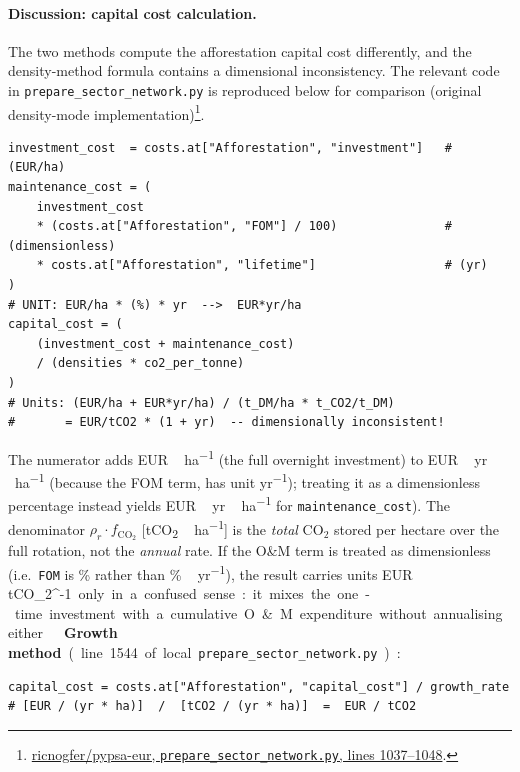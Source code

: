 \documentclass[12pt, a4paper]{article}
\begin{document}
\paragraph{Discussion: capital cost calculation.}
The two methods compute the afforestation capital cost differently,
and the density-method formula contains a dimensional inconsistency.
The relevant code in
\texttt{prepare\_sector\_network.py} is reproduced
below for comparison (original density-mode implementation)\footnote{%
  \href{https://github.com/ricnogfer/pypsa-eur/blob/c1e990cd634cf236e0fbcedcb46570057177ed6f/scripts/prepare_sector_network.py\#L1037--L1048}{%
    ricnogfer/pypsa-eur, \texttt{prepare\_sector\_network.py}, lines 1037--1048}.}.

\medskip

\begin{verbatim}
investment_cost  = costs.at["Afforestation", "investment"]   # (EUR/ha)
maintenance_cost = (
    investment_cost
    * (costs.at["Afforestation", "FOM"] / 100)               # (dimensionless)
    * costs.at["Afforestation", "lifetime"]                  # (yr)
)
# UNIT: EUR/ha * (%) * yr  -->  EUR*yr/ha
capital_cost = (
    (investment_cost + maintenance_cost)
    / (densities * co2_per_tonne)
)
# Units: (EUR/ha + EUR*yr/ha) / (t_DM/ha * t_CO2/t_DM)
#       = EUR/tCO2 * (1 + yr)  -- dimensionally inconsistent!
\end{verbatim}

\noindent The numerator adds \si{EUR\,ha^{-1}} (the full overnight investment) to
\si{EUR\,yr\,ha^{-1}} (because the FOM term, has unit
\si{yr^{-1}}); treating it as a dimensionless percentage instead yields
\si{EUR\,yr\,ha^{-1}} for \texttt{maintenance\_cost}). The denominator
$\rho_r \cdot f_{\mathrm{CO}_2}$ [\si{tCO_2\,ha^{-1}}] is the \emph{total}
CO$_2$ stored per hectare over the full rotation, not the \emph{annual} rate.
If the O\&M term is treated as dimensionless (i.e.\ \texttt{FOM} is
\si{\%} rather than \si{\%\,yr^{-1}}), the result carries units
\si{EUR\,tCO_2^{-1}} only in a confused sense: it mixes the one-time investment
with a cumulative O\&M expenditure without annualising either.

\medskip
\noindent\textbf{Growth method} (line 1544 of local \texttt{prepare\_sector\_network.py}):
\begin{verbatim}
capital_cost = costs.at["Afforestation", "capital_cost"] / growth_rate
# [EUR / (yr * ha)]  /  [tCO2 / (yr * ha)]  =  EUR / tCO2
\end{verbatim}
\end{document}
